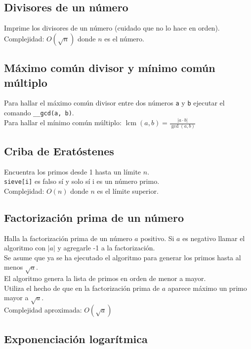 \documentclass[10pt,letterpaper,twocolumn]{article}
\newcommand{\source}[1]{
  
  \dotfill
}
\begin{document}
    \subsection{Divisores de un número}
      Imprime los divisores de un número (cuidado que no lo hace en orden).\\
      Complejidad: $O(\sqrt{n})$ donde $n$ es el número.\\
      \source{./src/divisors.cpp}

  \subsection{Máximo común divisor y mínimo común múltiplo}
  Para hallar el máximo común divisor entre dos números \verb|a| y \verb|b| ejecutar el comando \verb|__gcd(a, b)|.\\
  Para hallar el mínimo común múltiplo: \quad $ \displaystyle\operatorname{lcm}(a, b) = \frac{|a \cdot b|}{\operatorname{gcd}(a,b)}$

  \subsection{Criba de Eratóstenes}
  Encuentra los primos desde 1 hasta un límite $n$.\\
  \verb|sieve[i]| es falso sí y solo sí i es un número primo.\\
  Complejidad: $O(n)$ donde $n$ es el límite superior.\\
  \source{./src/sieve.cpp}

  \subsection{Factorización prima de un número}
  Halla la factorización prima de un número $a$ positivo. Si $a$ es negativo llamar el algoritmo con $|a|$ y agregarle -1 a la factorización.\\
  Se asume que ya se ha ejecutado el algoritmo para generar los primos hasta al menos $\sqrt{a}$.\\
  El algoritmo genera la lista de primos en orden de menor a mayor.\\
  Utiliza el hecho de que en la factorización prima de $a$ aparece máximo un primo mayor a $\sqrt{a}$.\\
  Complejidad aproximada: $O(\sqrt{a})$\\
  \source{./src/factorization.cpp}

  \subsection{Exponenciación logarítmica}
\end{document}
